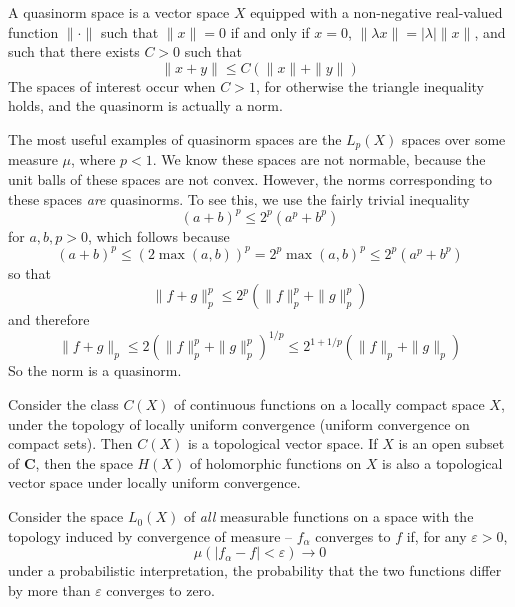 \begin{example}
    A quasinorm space is a vector space $X$ equipped with a non-negative real-valued function $\| \cdot \|$ such that $\| x \| = 0$ if and only if $x = 0$, $\| \lambda x \| = |\lambda| \| x \|$, and such that there exists $C > 0$ such that
    \[ \| x + y \| \leq C (\|x\| + \|y\|) \]
    The spaces of interest occur when $C > 1$, for otherwise the triangle inequality holds, and the quasinorm is actually a norm.

    The most useful examples of quasinorm spaces are the $L_p(X)$ spaces over some measure $\mu$, where $p < 1$. We know these spaces are not normable, because the unit balls of these spaces are not convex. However, the norms corresponding to these spaces {\it are} quasinorms. To see this, we use the fairly trivial inequality
    \[ (a + b)^p \leq 2^p(a^p + b^p) \]
    for $a,b, p > 0$, which follows because
    \[ (a + b)^p \leq (2 \max(a,b))^p = 2^p \max(a,b)^p \leq 2^p(a^p + b^p) \]
    so that
    \[ \| f + g \|_p^p \leq 2^p ( \| f \|_p^p + \| g \|_p^p ) \]
    and therefore
    \[ \| f + g \|_p \leq 2 ( \| f \|_p^p + \| g \|_p^p )^{1/p} \leq 2^{1 + 1/p} ( \| f \|_p + \| g \|_p ) \]
    So the norm is a quasinorm.
\end{example}

\begin{example}
    Consider the class $C(X)$ of continuous functions on a locally compact space $X$, under the topology of locally uniform convergence (uniform convergence on compact sets). Then $C(X)$ is a topological vector space. If $X$ is an open subset of $\mathbf{C}$, then the space $H(X)$ of holomorphic functions on $X$ is also a topological vector space under locally uniform convergence.
\end{example}

\begin{example}
    Consider the space $L_0(X)$ of {\it all} measurable functions on a space with the topology induced by convergence of measure -- $f_\alpha$ converges to $f$ if, for any $\varepsilon > 0$,
    \[ \mu ( |f_\alpha - f| < \varepsilon ) \to 0 \]
    under a probabilistic interpretation, the probability that the two functions differ by more than $\varepsilon$ converges to zero.
\end{example}

